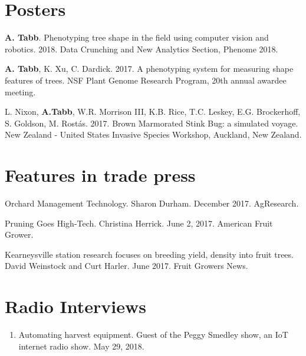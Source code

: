 \documentclass[letterpaper,11pt]{article}
\begin{document}

\section{Posters}
\begin{enumerate}[noitemsep, leftmargin=*,label={[P\arabic*]}]
\item{\textbf{A. Tabb}. Phenotyping tree shape in the field using computer vision and robotics. 2018. Data Crunching and New Analytics Section, Phenome 2018.}

\item{\textbf{A. Tabb}, K. Xu, C. Dardick.  2017. A phenotyping system for measuring shape features of trees. NSF Plant Genome Research Program, 20th annual awardee meeting. }

\item{L. Nixon, \textbf{A.Tabb}, W.R. Morrison III, K.B. Rice, T.C. Leskey, E.G. Brockerhoff, S. Goldson, M. Rost\'{a}s.  2017. Brown Marmorated Stink Bug: a simulated voyage. New Zealand - United States Invasive Species Workshop, Auckland, New Zealand. }
\end{enumerate}

\section{Features in trade press}
\begin{enumerate}[noitemsep, leftmargin=*,label={[\arabic*]}]
\item{ Orchard Management Technology. Sharon Durham. December 2017. AgResearch.}

\item{ Pruning Goes High-Tech.  Christina Herrick. June 2, 2017.  American Fruit Grower. } 

\item{ Kearneysville station research focuses on breeding yield, density into fruit trees.  David Weinstock and Curt Harler.  June 2017.  Fruit Growers News.}
\end{enumerate}

\section{ Radio Interviews}
\begin{enumerate}[noitemsep, leftmargin=*,label={}]
\item{ Automating harvest equipment. Guest of the Peggy Smedley show, an IoT internet radio show.  May 29, 2018.}
\end{enumerate}
\end{document}

